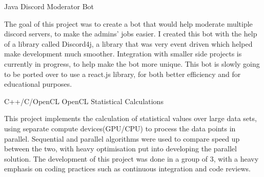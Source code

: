
\begin{cventries}
  \cventry
    {Java}
    {Discord Moderator Bot}
    {}
    {}
    {
      \begin{cvitems}
        \item {The goal of this project was to create a bot that would help moderate multiple discord servers, to make the admins' jobs easier. I created this bot with the help of a library called Discord4j, a library that was very event driven which helped make development much smoother. Integration with smaller side projects is currently in progress, to help make the bot more unique. This bot is slowly going to be ported over to use a react.js library, for both better efficiency and for educational purposes.}
      \end{cvitems}
    }
  \cventry
    {C++/C/OpenCL}
    {OpenCL Statistical Calculations}
    {}
    {}
    {
      \begin{cvitems}
        \item {This project implements the calculation of statistical values over large data sets, using separate compute devices(GPU/CPU) to process the data points in parallel. Sequential and parallel algorithms were used to compare speed up between the two, with heavy optimisation put into developing the parallel solution. The development of this project was done in a group of 3, with a heavy emphasis on coding practices such as continuous integration and code reviews. }
      \end{cvitems}
    }
\end{cventries}
\vspace{-5pt}